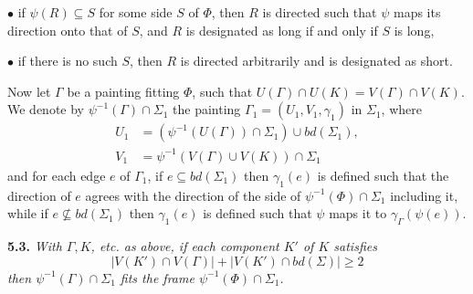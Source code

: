 \hspace*{12pt}$\bullet$ if $\psi(R) \subseteq S$ for some side $S$ of $\Phi$, then $R$ is directed such that $\psi$ maps its direction onto that of $S$, and $R$ is designated as long if and only if $S$ is long,

\hspace*{12pt}$\bullet$ if there is no such $S$, then $R$ is directed arbitrarily and is designated as short.

Now let $\Gamma$ be a painting fitting $\Phi$, such that $U(\Gamma) \cap U(K) = V(\Gamma) \cap V(K)$. We denote by $\psi^{-1}(\Gamma) \cap \Sigma_1$ the painting $\Gamma_1 = (U_1, V_1, \gamma_1)$ in $\Sigma_1$, where
\begin{align*}
U_1 &= (\psi^{-1}(U(\Gamma)) \cap \Sigma_1) \cup bd(\Sigma_1), \\
V_1 &= \psi^{-1}(V(\Gamma) \cup V(K)) \cap \Sigma_1
\end{align*}
and for each edge $e$ of $\Gamma_1$, if $e \subseteq bd(\Sigma_1)$ then $\gamma_1(e)$ is defined such that the direction of $e$ agrees with the direction of the side of $\psi^{-1}(\Phi) \cap \Sigma_1$ including it, while if $e \nsubseteq bd(\Sigma_1)$ then $\gamma_1(e)$ is defined such that $\psi$ maps it to $\gamma_\Gamma(\psi(e))$.

\textbf{5.3.} \textit{With $\Gamma, K$, etc. as above, if each component $K'$ of $K$ satisfies}
\begin{equation*}
|V(K') \cap V(\Gamma)| + |V(K') \cap bd(\Sigma)| \ge 2
\end{equation*}
\textit{then $\psi^{-1}(\Gamma) \cap \Sigma_1$ fits the frame $\psi^{-1}(\Phi) \cap \Sigma_1$.}

